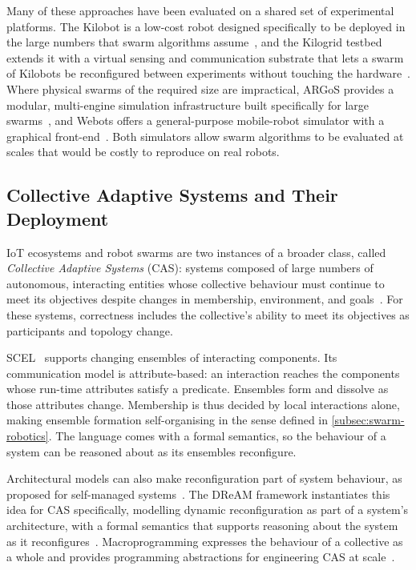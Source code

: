 Many of these approaches have been evaluated on a shared set of experimental platforms.
%
The Kilobot is a low-cost robot designed specifically to be deployed in the large numbers that swarm algorithms assume~\cite{DBLP:conf/icra/RubensteinAN12},
and the Kilogrid testbed extends it with a virtual sensing and communication substrate that lets a swarm of Kilobots be reconfigured between experiments without touching the hardware~\cite{valentini2018kilogrid}.
%
Where physical swarms of the required size are impractical,
ARGoS provides a modular, multi-engine simulation infrastructure built specifically for large swarms~\cite{pinciroli2012argos},
and Webots offers a general-purpose mobile-robot simulator with a graphical front-end~\cite{Michel2004}.
Both simulators allow swarm algorithms to be evaluated at scales that would be costly to reproduce on real robots.

\subsection{Collective Adaptive Systems and Their Deployment}
\label{subsec:collective-adaptive-systems}

\ac{IoT} ecosystems and robot swarms are two instances of a broader class,
called \emph{Collective Adaptive Systems} (CAS):
systems composed of large numbers of autonomous, interacting entities whose collective behaviour must continue to meet its objectives despite changes in membership,
environment,
and goals~\cite{DBLP:journals/sttt/NicolaJW20}.
%
For these systems, correctness includes the collective's ability to meet its objectives as participants and topology change.

SCEL~\cite{DBLP:journals/taas/NicolaLPT14} supports changing ensembles of interacting components.
%
Its communication model is attribute-based:
an interaction reaches the components whose run-time attributes satisfy a predicate.
Ensembles form and dissolve as those attributes change.
%
Membership is thus decided by local interactions alone,
making ensemble formation self-organising in the sense defined in \cref{subsec:swarm-robotics}.
%
The language comes with a formal semantics,
so the behaviour of a system can be reasoned about as its ensembles reconfigure.

Architectural models can also make reconfiguration part of system behaviour,
as proposed for self-managed systems~\cite{DBLP:conf/icse/KramerM07}.
%
The DReAM framework instantiates this idea for \ac{CAS} specifically,
modelling dynamic reconfiguration as part of a system's architecture,
with a formal semantics that supports reasoning about the system as it reconfigures~\cite{DBLP:journals/sttt/NicolaMS20}.
%
Macroprogramming expresses the behaviour of a collective as a whole and provides programming abstractions for engineering \ac{CAS} at scale~\cite{DBLP:journals/csur/Casadei23}.


